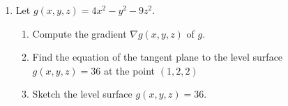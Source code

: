 \documentclass[12pt]{article}
\begin{document}
\begin{enumerate}
\begin{enumerate}
\vspace{2.5in}
\end{enumerate}
\item Let $g(x,y,z) = 4x^2-y^2-9z^2$.
\begin{enumerate}
 \item Compute the gradient $\nabla g(x,y,z)$ of $g$.\marginpar{[3]}

\vspace{1in}

 \item Find the equation of the tangent plane to the level surface $g(x,y,z)=36$ at the point $(1,2,2)$ \marginpar{[4]}

\vspace{1.5in}

 \item Sketch the level surface $g(x,y,z)=36$. \marginpar{[3]}
\end{enumerate}


\end{enumerate}
\end{document}
